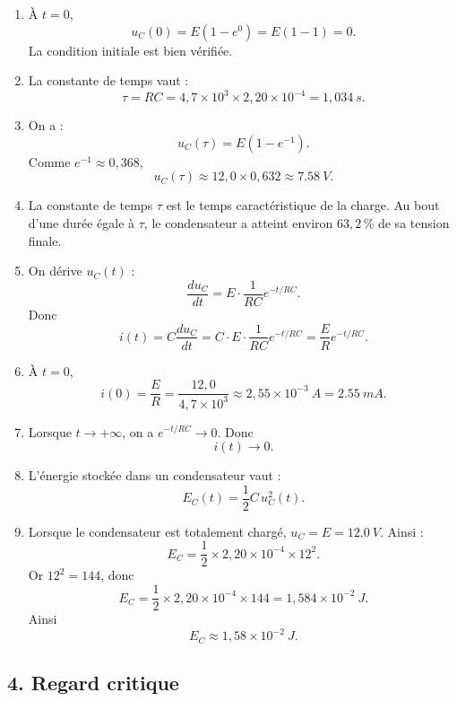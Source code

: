\documentclass[11pt,a4paper]{article}
\begin{document}
\begin{enumerate}
    \item À \(t=0\),
    \[
    u_C(0)=E(1-e^0)=E(1-1)=0.
    \]
    La condition initiale est bien vérifiée.

    \item La constante de temps vaut :
    \[
    \tau=RC=4{,}7\times10^3\times2{,}20\times10^{-4}=1{,}034\ \si{s}.
    \]

    \item On a :
    \[
    u_C(\tau)=E(1-e^{-1}).
    \]
    Comme \(e^{-1}\approx 0{,}368\),
    \[
    u_C(\tau)\approx 12{,}0\times0{,}632\approx \SI{7.58}{V}.
    \]

    \item La constante de temps \(\tau\) est le temps caractéristique de la charge. Au bout d'une durée égale à \(\tau\), le condensateur a atteint environ \(63{,}2\,\%\) de sa tension finale.

    \item On dérive \(u_C(t)\) :
    \[
    \frac{du_C}{dt}=E\cdot \frac{1}{RC}e^{-t/RC}.
    \]
    Donc
    \[
    i(t)=C\frac{du_C}{dt}=C\cdot E\cdot \frac{1}{RC}e^{-t/RC}
    =\frac{E}{R}e^{-t/RC}.
    \]

    \item À \(t=0\),
    \[
    i(0)=\frac{E}{R}=\frac{12{,}0}{4{,}7\times10^3}
    \approx 2{,}55\times10^{-3}\ \si{A}
    =\SI{2.55}{mA}.
    \]

    \item Lorsque \(t\to+\infty\), on a \(e^{-t/RC}\to 0\). Donc
    \[
    i(t)\to 0.
    \]

    \item L'énergie stockée dans un condensateur vaut :
    \[
    E_C(t)=\frac12 C\,u_C^2(t).
    \]

    \item Lorsque le condensateur est totalement chargé, \(u_C=E=\SI{12.0}{V}\). Ainsi :
    \[
    E_C=\frac12\times 2{,}20\times10^{-4}\times 12^2.
    \]
    Or \(12^2=144\), donc
    \[
    E_C=\frac12\times 2{,}20\times10^{-4}\times 144
    =1{,}584\times10^{-2}\ \si{J}.
    \]
    Ainsi
    \[
    E_C\approx 1{,}58\times10^{-2}\ \si{J}.
    \]
\end{enumerate}

\subsection*{4. Regard critique}
\end{document}
